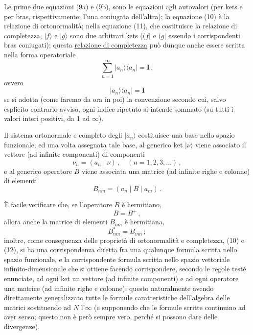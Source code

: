 \documentclass[11pt, a4paper]{book}
\numberwithin{equation}{section}
\begin{document}
Le prime due equazioni (9a) e (9b), sono le equazioni agli autovalori (per kets e per bras, rispettivamente; l'una coniugata dell'altra); la equazione (10) è la relazione di ortonormalità; nella equazione (11), che costituisce la relazione di completezza, $|f\rangle$ e $|g\rangle$ sono due arbitrari kets ($(f|$ e $(g|$ essendo i corrispondenti bras coniugati); questa \underline{relazione di completezza} può dunque anche essere scritta nella forma operatoriale
\begin{equation}
\sum_{n=1}^{\infty}|a_n\rangle\langle a_n|=\mathbf{I}\,, \tag{12a}
\end{equation}
ovvero
\begin{equation}
|a_n\rangle\langle a_n|=\mathbf{I} \tag{12b}
\end{equation}
se si adotta (come faremo da ora in poi) la convenzione secondo cui, salvo esplicito contrario avviso, ogni indice ripetuto si intende sommato (su tutti i valori interi positivi, da 1 ad $\infty$).

Il sistema ortonormale e completo degli $|a_n\rangle$ costituisce una base nello spazio funzionale; ed una volta assegnata tale base, al generico ket $|\nu\rangle$ viene associato il vettore (ad infinite componenti) di componenti
\begin{equation}
\nu_n=(a_n\mid\nu)\,,\quad(n=1,2,3,\ldots)\,, \tag{13}
\end{equation}
e al generico operatore $B$ viene associata una matrice (ad infinite righe e colonne) di elementi
\begin{equation}
B_{nm}=(a_n\mid B\mid a_m)\,. \tag{14}
\end{equation}

È facile verificare che, se l'operatore $B$ è hermitiano,
\begin{equation}
B=B^+\,, \tag{15a}
\end{equation}
allora anche la matrice di elementi $B_{nm}$ è hermitiana,
\begin{equation}
B_{nm}^*=B_{mn}\,; \tag{15b}
\end{equation}
inoltre, come conseguenza delle proprietà di ortonormalità e completezza, (10) e (12), si ha una corrispondenza diretta fra una qualunque formula scritta nello spazio funzionale, e la corrispondente formula scritta nello spazio vettoriale infinito-dimensionale che si ottiene facendo corrispondere, secondo le regole testé enunciate, ad ogni ket un vettore (ad infinite componenti) e ad ogni operatore una matrice (ad infinite righe e colonne); questo naturalmente avendo direttamente generalizzato tutte le formule caratteristiche dell'algebra delle matrici sostituendo ad $N$ l'$\infty$ (e supponendo che le formule scritte continuino ad aver senso; questo non è però sempre vero, perché si possono dare delle divergenze).
\end{document}
